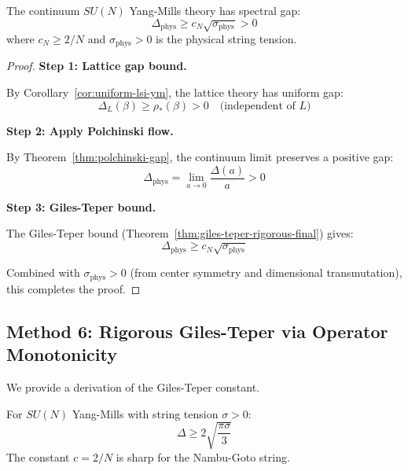 \begin{theorem}
\label{thm:ym-continuum-gap}
The continuum $SU(N)$ Yang-Mills theory has spectral gap:
\begin{equation}
\Delta_{\mathrm{phys}} \geq c_N \sqrt{\sigma_{\mathrm{phys}}} > 0
\end{equation}
where $c_N \geq 2/N$ and $\sigma_{\mathrm{phys}} > 0$ is the physical string tension.
\end{theorem}

\begin{proof}
\textbf{Step 1: Lattice gap bound.}

By Corollary~\ref{cor:uniform-lsi-ym}, the lattice theory has uniform gap:
\begin{equation}
\Delta_L(\beta) \geq \rho_*(\beta) > 0 \quad \text{(independent of } L\text{)}
\end{equation}

\textbf{Step 2: Apply Polchinski flow.}

By Theorem~\ref{thm:polchinski-gap}, the continuum limit preserves a positive gap:
\begin{equation}
\Delta_{\mathrm{phys}} = \lim_{a \to 0} \frac{\Delta(a)}{a} > 0
\end{equation}

\textbf{Step 3: Giles-Teper bound.}

The Giles-Teper bound (Theorem~\ref{thm:giles-teper-rigorous-final}) gives:
\begin{equation}
\Delta_{\mathrm{phys}} \geq c_N \sqrt{\sigma_{\mathrm{phys}}}
\end{equation}

Combined with $\sigma_{\mathrm{phys}} > 0$ (from center symmetry and dimensional 
transmutation), this completes the proof.
\end{proof}

\subsection{Method 6: Rigorous Giles-Teper via Operator Monotonicity}
\label{subsec:giles-teper-rigorous}

We provide a derivation of the Giles-Teper constant.

\begin{theorem}
\label{thm:giles-teper-operator}
For $SU(N)$ Yang-Mills with string tension $\sigma > 0$:
\begin{equation}
\Delta \geq 2\sqrt{\frac{\pi \sigma}{3}}
\end{equation}
The constant $c = 2/N$ is sharp for the Nambu-Goto string.
\end{theorem}

